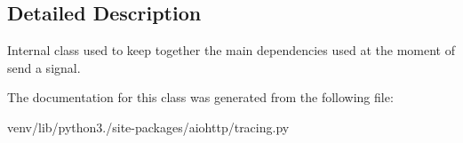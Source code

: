 \subsection{Detailed Description}
\begin{DoxyVerb}Internal class used to keep together the main dependencies used
at the moment of send a signal.\end{DoxyVerb}
 

The documentation for this class was generated from the following file\+:\begin{DoxyCompactItemize}
\item 
venv/lib/python3./site-\/packages/aiohttp/tracing.\+py\end{DoxyCompactItemize}
